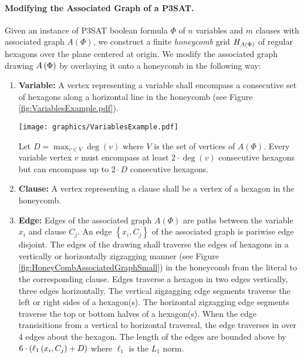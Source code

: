 \paragraph{Modifying the Associated Graph of a P3SAT.}

Given an instance of P3SAT boolean formula $\Phi$ of $n$ variables and $m$ clauses with associated graph $A(\Phi)$, we construct a finite \textit{honeycomb} grid $H_{A \left( \Phi \right)}$ of regular hexagons over the plane centered at origin.
We modify the associated graph drawing $A\left( \Phi \right)$ by overlaying it onto a honeycomb in the following way:

\begin{enumerate}
\item \textbf{Variable:} A vertex representing a variable shall encompass a consecutive set of hexagons along a horizontal line in the honeycomb (see Figure \ref{fig:VariablesExample.pdf}).

\begin{minipage}{\linewidth}
\begin{center}
\texttt{[image: graphics/VariablesExample.pdf]}
\label{fig:VariablesExample.pdf}
\end{center}
\end{minipage}

Let $D = \max_{v \in V} \deg(v)$ where $V$ is the set of vertices of $A(\Phi)$.
Every variable vertex $v$  must encompass at least $2 \cdot \deg(v)$ consecutive hexagons but can encompass up to $2 \cdot D$ consecutive hexagons.
\item \textbf{Clause:} A vertex representing a clause shall be a vertex of a hexagon in the honeycomb.
\item \textbf{Edge:} Edges of the associated graph $A(\Phi)$ are paths between the variable $x_i$ and clause $C_j$.  An edge $\left\lbrace x_i, C_j \right\rbrace$ of the associated graph is pariwise edge disjoint. 
The edges of the drawing shall traverse the edges of hexagons in a vertically or horizontally zigzagging manner (see Figure \ref{fig:HoneyCombAssociatedGraphSmall}) in the honeycomb from the literal to the corresponding clause. 
Edges traverse a hexagon in two edges vertically, three edges horizontally.  
The vertical zigzagging edge segments traverse the left or right sides of a hexagon(s).
The horizontal zigzagging edge segments traverse the top or bottom halves of a hexagon(s).
When the edge transisitions from a vertical to horizontal traversal, the edge traverses in over 4 edges about the hexagon.
The length of the edges are bounded above by $6 \cdot \left( \ell_1 \left( x_i,C_j \right) + D \right)$ where $\ell_1$ is the $L_1$ norm. 
\end{enumerate}

